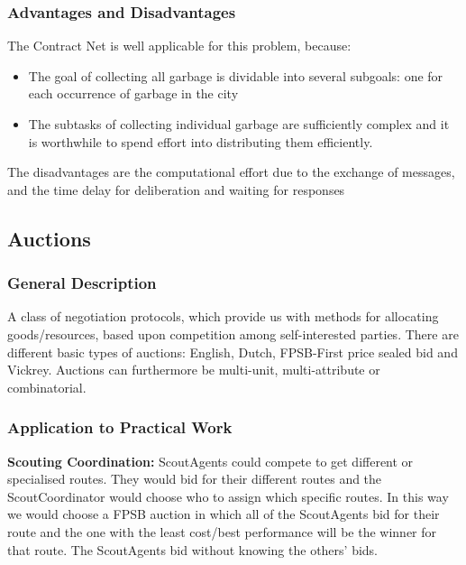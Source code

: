 \subsubsection{Advantages and Disadvantages}

The Contract Net is well applicable for this problem, because:

\begin{itemize}
	\item The goal of collecting all garbage is dividable into several subgoals: one for each occurrence of garbage in the city
	\item The subtasks of collecting individual garbage are sufficiently complex and it is worthwhile to spend effort into distributing them efficiently. 
\end{itemize}

The disadvantages are the computational effort due to the exchange of messages, and the time delay for deliberation and waiting for responses 



\subsection{Auctions}

\subsubsection{General Description}

A class of negotiation protocols, which provide us with methods for allocating goods/resources, based upon competition among self-interested parties.
There are different basic types of auctions: English, Dutch, FPSB-First price sealed bid and Vickrey. Auctions can furthermore be multi-unit, multi-attribute or combinatorial.

\subsubsection{Application to Practical Work}

\textbf{Scouting Coordination:} ScoutAgents could compete to get different or specialised routes. They would bid for their different routes and the ScoutCoordinator would choose who to assign which specific routes. In this way we would choose a FPSB auction in which all of the ScoutAgents bid for their route and the one with the least cost/best performance will be the winner for that route. The ScoutAgents bid without knowing the others' bids.

